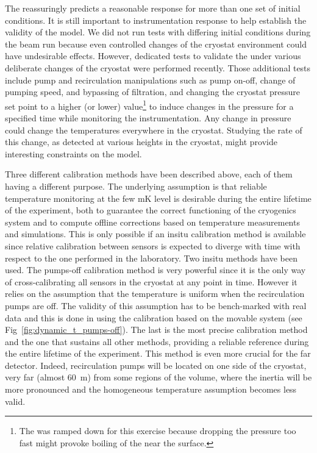 The  reassuringly predicts a reasonable response for more than one set of initial conditions. It is still important to %
instrumentation response to help establish the validity of the  model. We did not run tests with differing initial conditions during the beam run because even controlled changes of the cryostat environment could have undesirable effects. However, dedicated tests to validate the  under various deliberate changes of the cryostat were performed recently. Those  additional tests include pump and recirculation manipulations such as pump on-off, change of pumping speed, and bypassing of filtration, and changing the cryostat pressure set point to a higher (or lower) value\footnote{The  %
was ramped down for this exercise because dropping the pressure too fast might provoke boiling of the  near the surface.} to induce changes in the pressure for a specified time while monitoring the instrumentation. Any change in pressure could change the temperatures everywhere in the cryostat. Studying the rate of this change, as detected at various heights in the cryostat, might provide interesting constraints on the  model.


Three different calibration methods have been described above, each of them having a different purpose. The underlying assumption is that reliable temperature monitoring at the few mK level is desirable during the entire lifetime of the experiment, both to guarantee the correct functioning of the cryogenics system and to compute offline corrections based on temperature measurements and  simulations. This is only possible if an insitu calibration method is available since relative calibration between sensors is expected to diverge with time with respect to the one performed in the laboratory. Two insitu methods have been used. The pumps-off calibration method is very powerful since it is the only way of cross-calibrating all sensors in the cryostat at any point in time. However it relies on the assumption that the temperature is uniform when the recirculation pumps are off. The validity of this assumption has to be bench-marked with real data and this is done in  using the calibration based on the movable system (see Fig~\ref{fig:dynamic_t_pumps-off}). The last is the most precise calibration method and the one that sustains all other methods, providing a reliable reference during the entire lifetime of the experiment. This method is even more crucial for the far detector. Indeed, recirculation pumps will be located on one side of the cryostat, very far (almost \SI{60}{m}) from some regions of the  volume, where the inertia will be more pronounced and the homogeneous temperature assumption becomes less valid.   

